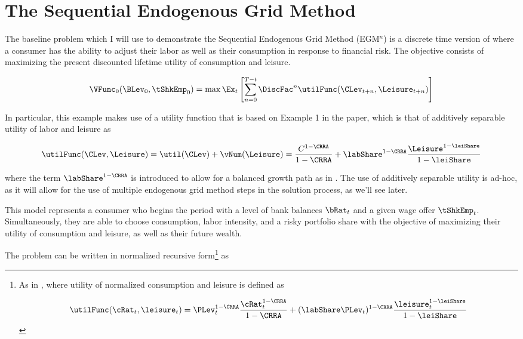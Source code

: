 \documentclass[\econtexRoot/SequentialEGM]{subfiles}
\begin{document}
\hypertarget{method}{}
\par\section{The Sequential Endogenous Grid Method}
\notinsubfile{\label{sec:method}}


The baseline problem which I will use to demonstrate the Sequential Endogenous Grid Method (EGM$^n$) is a discrete time version of \cite{Bodie1992-yp} where a consumer has the ability to adjust their labor as well as their consumption in response to financial risk. The objective consists of maximizing the present discounted lifetime utility of consumption and leisure.

\begin{equation}
    \VFunc_0(\BLev_0, \tShkEmp_0) = \max \Ex_{t} \left[ \sum_{n = 0}^{T-t} \DiscFac^{n} \utilFunc(\CLev_{t+n}, \Leisure_{t+n})  \right]
\end{equation}

In particular, this example makes use of a utility function that is based on Example 1 in the paper, which is that of additively separable utility of labor and leisure as

\begin{equation}
    \utilFunc(\CLev, \Leisure) = \util(\CLev) + \vNum(\Leisure) = \frac{C^{1-\CRRA}}{1-\CRRA} + \labShare^{1-\CRRA} \frac{\Leisure^{1-\leiShare}}{1-\leiShare}
\end{equation}

where the term $\labShare^{1-\CRRA}$ is introduced to allow for a balanced growth path as in \cite{Mertens2011-ap}. The use of additively separable utility is ad-hoc, as it will allow for the use of multiple endogenous grid method steps in the solution process, as we'll see later.

This model represents a consumer who begins the period with a level of bank balances $\bRat_{t}$ and a given wage offer $\tShkEmp_{t}$. Simultaneously, they are able to choose consumption, labor intensity, and a risky portfolio share with the objective of maximizing their utility of consumption and leisure, as well as their future wealth.

The problem can be written in normalized recursive form\footnote{
    As in \cite{Carroll2009-zq}, where utility of normalized consumption and leisure is defined as

    \begin{equation}
        \utilFunc(\cRat_{t}, \leisure_{t}) = \PLev_{t}^{1-\CRRA} \frac{\cRat_{t}^{1-\CRRA}}{1-\CRRA} + (\labShare\PLev_{t})^{1-\CRRA} \frac{\leisure_{t}^{1-\leiShare}}{1-\leiShare}
    \end{equation}

} as
\end{document}
